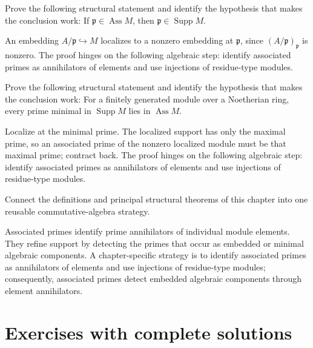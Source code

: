 \begin{problem}\label{prob:v17-problem-10}
Prove the following structural statement and identify the hypothesis that makes the conclusion work: If $\mathfrak p\in\operatorname{Ass}M$, then $\mathfrak p\in\operatorname{Supp}M$.
\end{problem}
\begin{solution}
An embedding $A/\mathfrak p\hookrightarrow M$ localizes to a nonzero embedding at $\mathfrak p$, since $(A/\mathfrak p)_{\mathfrak p}$ is nonzero. The proof hinges on the following algebraic step: identify associated primes as annihilators of elements and use injections of residue-type modules.
\end{solution}

\begin{problem}\label{prob:v17-problem-11}
Prove the following structural statement and identify the hypothesis that makes the conclusion work: For a finitely generated module over a Noetherian ring, every prime minimal in $\operatorname{Supp}M$ lies in $\operatorname{Ass}M$.
\end{problem}
\begin{solution}
Localize at the minimal prime. The localized support has only the maximal prime, so an associated prime of the nonzero localized module must be that maximal prime; contract back. The proof hinges on the following algebraic step: identify associated primes as annihilators of elements and use injections of residue-type modules.
\end{solution}

\begin{problem}\label{prob:v17-problem-12}
Connect the definitions and principal structural theorems of this chapter into one reusable commutative-algebra strategy.
\end{problem}
\begin{solution}
Associated primes identify prime annihilators of individual module elements. They refine support by detecting the primes that occur as embedded or minimal algebraic components. A chapter-specific strategy is to identify associated primes as annihilators of elements and use injections of residue-type modules; consequently, associated primes detect embedded algebraic components through element annihilators.
\end{solution}

\section{Exercises with complete solutions}

